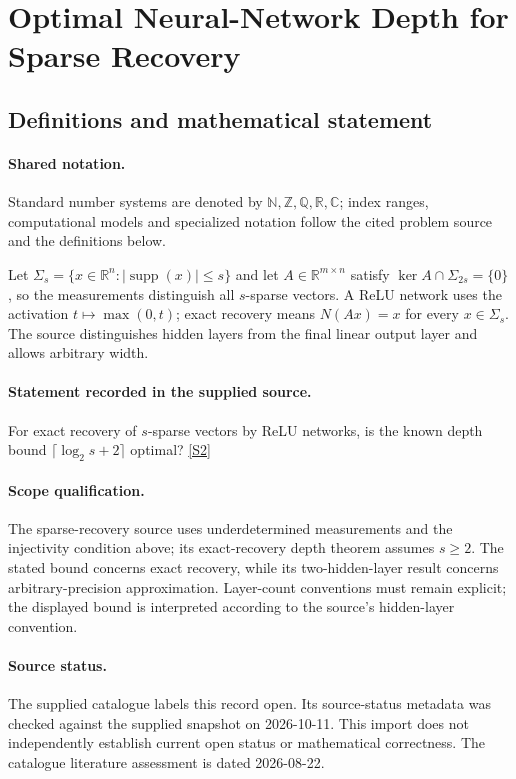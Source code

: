 \documentclass[11pt]{article}
\newcommand{\sref}[2]{\hyperlink{source:#1:#2}{[S#2]}}
\begin{document}
\section{Optimal Neural-Network Depth for Sparse Recovery}\label{statement}

\subsection{Definitions and mathematical statement}

\paragraph{Shared notation.}Standard number systems are denoted by $\mathbb N,\mathbb Z,\mathbb Q,\mathbb R,\mathbb C$; index ranges, computational models and specialized notation follow the cited problem source and the definitions below.


Let $\Sigma_s=\{x\in\mathbb R^n:|\operatorname{supp}(x)|\leq s\}$ and let $A\in\mathbb R^{m\times n}$ satisfy $\ker A\cap\Sigma_{2s}=\{0\}$, so the measurements distinguish all $s$-sparse vectors. A ReLU network uses the activation $t\mapsto\max(0,t)$; exact recovery means $N(Ax)=x$ for every $x\in\Sigma_s$. The source distinguishes hidden layers from the final linear output layer and allows arbitrary width.
\paragraph{Statement recorded in the supplied source.}
For exact recovery of $s$-sparse vectors by ReLU networks, is the known depth bound $\lceil\log_2s+2\rceil$ optimal? \sref{statement}{2}
\paragraph{Scope qualification.}
The sparse-recovery source uses underdetermined measurements and the injectivity condition above; its exact-recovery depth theorem assumes $s\geq2$. The stated bound concerns exact recovery, while its two-hidden-layer result concerns arbitrary-precision approximation. Layer-count conventions must remain explicit; the displayed bound is interpreted according to the source's hidden-layer convention.
\paragraph{Source status.}
The supplied catalogue labels this record open. Its source-status metadata was checked against the supplied snapshot on 2026-10-11. This import does not independently establish current open status or mathematical correctness. The catalogue literature assessment is dated 2026-08-22.
\end{document}
